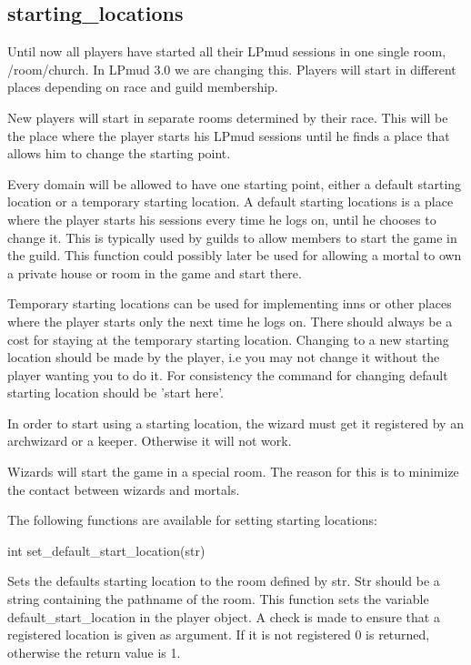 \subsection{starting\_locations}

Until now all players have started all their LPmud sessions in one
single room, /room/church. In LPmud 3.0 we are changing this. Players
will start in different places depending on race and guild membership.
    
New players will start in separate rooms determined by their race.
This will be the place where the player starts his LPmud sessions
until he finds a place that allows him to change the starting point.

Every domain will be allowed to have one starting point, either a
default starting location or a temporary starting location. A default
starting locations is a place where the player starts his sessions
every time he logs on, until he chooses to change it. This is
typically used by guilds to allow members to start the game in the
guild. This function could possibly later be used for allowing a
mortal to own a private house or room in the game and start there.

Temporary starting locations can be used for implementing inns or
other places where the player starts only the next time he logs on.
There should always be a cost for staying at the temporary starting
location. Changing to a new starting location should be made by the
player, i.e you may not change it without the player wanting you to do
it. For consistency the command for changing default starting location
should be 'start here'.

In order to start using a starting location, the wizard must get it
registered by an archwizard or a keeper. Otherwise it will not work.

Wizards will start the game in a special room. The reason for this is
to minimize the contact between wizards and mortals.

The following functions are available for setting starting locations:

int set\_default\_start\_location(str)

Sets the defaults starting location to the room defined by str. Str
should be a string containing the pathname of the room. This function
sets the variable default\_start\_location in the player object. A check
is made to ensure that a registered location is given as argument. If
it is not registered 0 is returned, otherwise the return value is 1.

